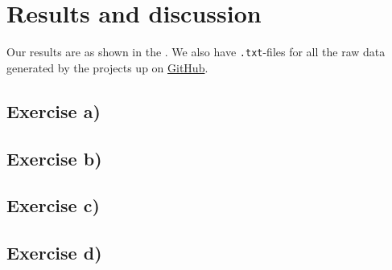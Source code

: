 \documentclass{article}
\begin{document}
\vspace{1cm}

\section{Results and discussion} \label{sec:Results}

  Our results are as shown in the . We also have \texttt{.txt}-files for all the raw data generated by the projects up on \href{https://github.com/Erikbgram/Fys3150}{GitHub}. \\

  \subsection{Exercise a)} \label{sec:Results a)}



  \subsection{Exercise b)} \label{sec:Results b)}



  \subsection{Exercise c)} \label{sec:Results c)}



\iffalse
  \begin{lstlisting}[language=C++]
    std::cout << "index, value\n";
  for(int i = 0; i < n; i++){
      std::cout << "    " << i << ", " << d_new[i] << std::endl;
  }
  \end{lstlisting}
\fi


\iffalse
  \begin{verbatim}
index, value
    0, 2
    1, 1.5
    2, 1.33333
    3, 1.25
    4, 1.2
    5, 1.16667
    6, 1.14286
    7, 1.125
    8, 1.11111
    9, 1.1
index, value
    0, 2
    1, 2
    2, 1.5
    3, 1.33333
    4, 1.25
    5, 1.2
    6, 1.16667
    7, 1.14286
    8, 1.125
    9, 1.11111
  \end{verbatim}
\fi


  \subsection{Exercise d)} \label{sec:Results d)}
\end{document}

